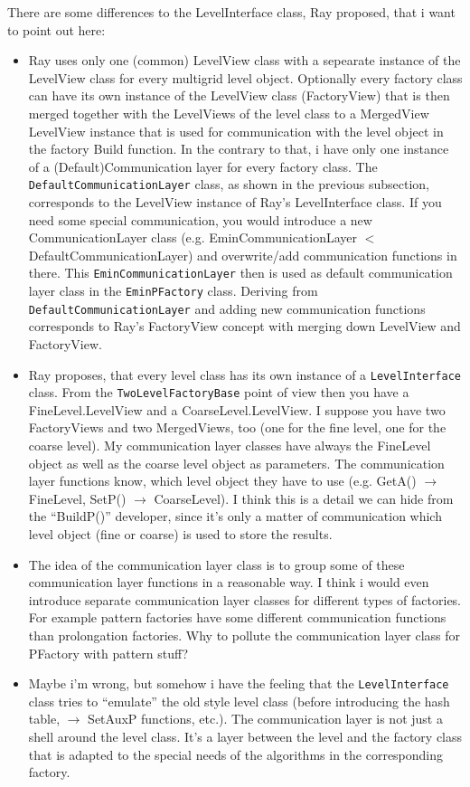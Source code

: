 There are some differences to the LevelInterface class, Ray proposed, that i want to point out here:
\begin{itemize}
 \item Ray uses only one (common) LevelView class with a sepearate instance of the LevelView class for every multigrid level object. Optionally every factory class can have its own instance of the LevelView class (FactoryView) that is then merged together with the LevelViews of the level class to a MergedView LevelView instance that is used for communication with the level object in the factory Build function. In the contrary to that, i have only one instance of a (Default)Communication layer for every factory class. The \verb|DefaultCommunicationLayer| class, as shown in the previous subsection, corresponds to the LevelView instance of Ray's LevelInterface class. If you need some special communication, you would introduce a new CommunicationLayer class (e.g. EminCommunicationLayer $<$ DefaultCommunicationLayer) and overwrite/add communication functions in there. This \verb|EminCommunicationLayer| then is used as default communication layer class in the \verb|EminPFactory| class. Deriving from \verb|DefaultCommunicationLayer| and adding new communication functions corresponds to Ray's FactoryView concept with merging down LevelView and FactoryView.
 \item Ray proposes, that every level class has its own instance of a \verb|LevelInterface| class. From the \verb|TwoLevelFactoryBase| point of view then you have a FineLevel.LevelView and a CoarseLevel.LevelView. I suppose you have two FactoryViews and two MergedViews, too (one for the fine level, one for the coarse level).
My communication layer classes have always the FineLevel object as well as the coarse level object as parameters. The communication layer functions know, which level object they have to use (e.g. GetA() $\rightarrow$ FineLevel, SetP() $\rightarrow$ CoarseLevel). I think this is a detail we can hide from the ``BuildP()'' developer, since it's only a matter of communication which level object (fine or coarse) is used to store the results.
 \item The idea of the communication layer class is to group some of these communication layer functions in a reasonable way. I think i would even introduce separate communication layer classes for different types of factories. For example pattern factories have some different communication functions than prolongation factories. Why to pollute the communication layer class for PFactory with pattern stuff?
 \item Maybe i'm wrong, but somehow i have the feeling that the \verb|LevelInterface| class tries to ``emulate'' the old style level class (before introducing the hash table, $\rightarrow$ SetAuxP functions, etc.). The communication layer is not just a shell around the level class. It's a layer between the level and the factory class that is adapted to the special needs of the algorithms in the corresponding factory.
\end{itemize}

